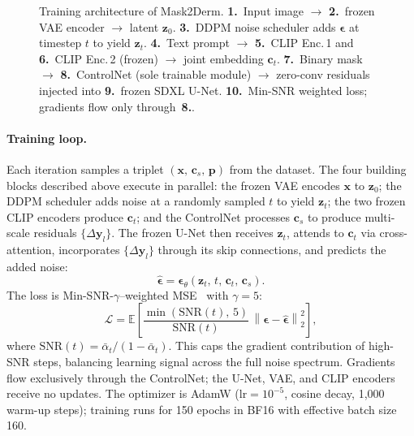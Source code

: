 \begin{figure}[H]
    \centering
    \resizebox{\linewidth}{!}{%
        \sffamily
    }
    \caption{Training architecture of Mask2Derm. \textbf{1.}~Input image $\to$ \textbf{2.}~frozen VAE encoder $\to$ latent $\mathbf{z}_0$. \textbf{3.}~DDPM noise scheduler adds $\boldsymbol{\epsilon}$ at timestep $t$ to yield $\mathbf{z}_t$. \textbf{4.}~Text prompt $\to$ \textbf{5.}~CLIP Enc.\,1 and \textbf{6.}~CLIP Enc.\,2 (frozen) $\to$ joint embedding $\mathbf{c}_t$. \textbf{7.}~Binary mask $\to$ \textbf{8.}~ControlNet (sole trainable module) $\to$ zero-conv residuals injected into \textbf{9.}~frozen SDXL U-Net. \textbf{10.}~Min-SNR weighted loss; gradients flow only through~\textbf{8.}.}
    \label{fig:architecture}
\end{figure}

\paragraph{Training loop.}
Each iteration samples a triplet $(\mathbf{x},\,\mathbf{c}_s,\,\mathbf{p})$ from the dataset. The four building blocks described above execute in parallel: the frozen VAE encodes $\mathbf{x}$ to $\mathbf{z}_0$; the DDPM scheduler adds noise at a randomly sampled $t$ to yield $\mathbf{z}_t$; the two frozen CLIP encoders produce $\mathbf{c}_t$; and the ControlNet processes $\mathbf{c}_s$ to produce multi-scale residuals $\{\Delta\mathbf{y}_l\}$. The frozen U-Net then receives $\mathbf{z}_t$, attends to $\mathbf{c}_t$ via cross-attention, incorporates $\{\Delta\mathbf{y}_l\}$ through its skip connections, and predicts the added noise:
\begin{equation}
    \hat{\boldsymbol{\epsilon}} = \boldsymbol{\epsilon}_\theta\!\left(\mathbf{z}_t,\, t,\, \mathbf{c}_t,\, \mathbf{c}_s\right).
\end{equation}
The loss is Min-SNR-$\gamma$–weighted MSE~\cite{hang2023efficient} with $\gamma=5$:
\begin{equation}
    \mathcal{L} = \mathbb{E}\!\left[\frac{\min(\mathrm{SNR}(t),\,5)}{\mathrm{SNR}(t)}\,\left\|\boldsymbol{\epsilon} - \hat{\boldsymbol{\epsilon}}\right\|^2_2\right],
\end{equation}
where $\mathrm{SNR}(t)=\bar{\alpha}_t/(1-\bar{\alpha}_t)$. This caps the gradient contribution of high-SNR steps, balancing learning signal across the full noise spectrum. Gradients flow exclusively through the ControlNet; the U-Net, VAE, and CLIP encoders receive no updates. The optimizer is AdamW ($\mathrm{lr}=10^{-5}$, cosine decay, 1{,}000 warm-up steps); training runs for 150 epochs in BF16 with effective batch size 160.

